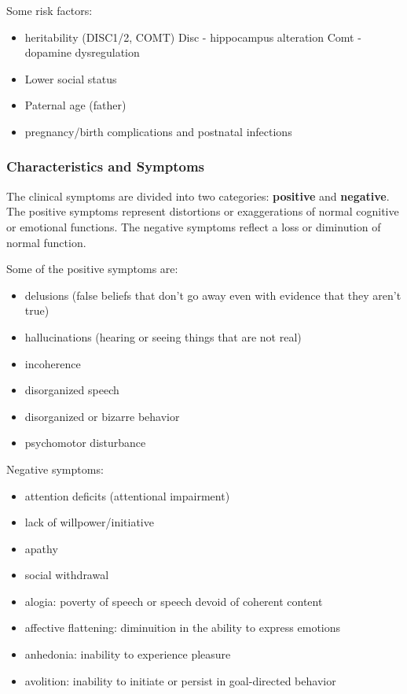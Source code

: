 \documentclass[12pt,article,oneside,a4paper]{memoir}
\begin{document}
Some risk factors:
\begin{itemize}
\item heritability (DISC1/2, COMT)
\subitem Disc - hippocampus alteration
\subitem Comt - dopamine dysregulation
\item Lower social status
\item Paternal age (father)
\item pregnancy/birth complications and postnatal infections
\end{itemize}

\subsubsection{Characteristics and Symptoms}

The clinical symptoms are divided into two categories: \textbf{positive} and
\textbf{negative}. The positive symptoms represent distortions or exaggerations
of normal cognitive or emotional functions. The negative symptoms reflect a
loss or diminution of normal function.

Some of the positive symptoms are:
\begin{itemize}
\item delusions (false beliefs that don't go away even with evidence that they
aren't true)
\item hallucinations (hearing or seeing things that are not real)
\item incoherence
\item disorganized speech
\item disorganized or bizarre behavior
\item psychomotor disturbance
\end{itemize}

Negative symptoms:
\begin{itemize}
\item attention deficits (attentional impairment)
\item lack of willpower/initiative
\item apathy
\item social withdrawal
\item alogia: poverty of speech or speech devoid of coherent content
\item affective flattening: diminuition in the ability to express emotions
\item anhedonia: inability to experience pleasure
\item avolition: inability to initiate or persist in goal-directed behavior
\end{itemize}
\end{document}
